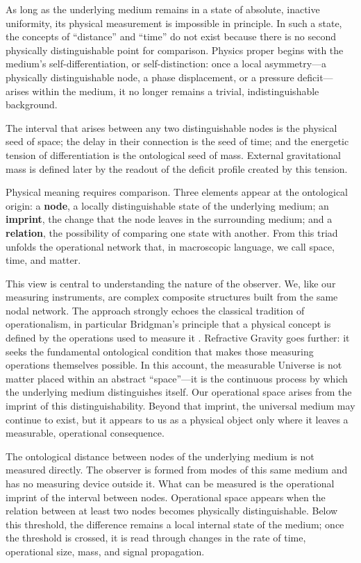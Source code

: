 \documentclass[11pt,a4paper]{article}
\begin{document}
As long as the underlying medium remains in a state of absolute, inactive uniformity, its physical measurement is impossible in principle. In such a state, the concepts of ``distance'' and ``time'' do not exist because there is no second physically distinguishable point for comparison. Physics proper begins with the medium's self-differentiation, or self-distinction: once a local asymmetry---a physically distinguishable node, a phase displacement, or a pressure deficit---arises within the medium, it no longer remains a trivial, indistinguishable background.

The interval that arises between any two distinguishable nodes is the physical seed of space; the delay in their connection is the seed of time; and the energetic tension of differentiation is the ontological seed of mass. External gravitational mass is defined later by the readout of the deficit profile created by this tension.

Physical meaning requires comparison. Three elements appear at the ontological origin: a \textbf{node}, a locally distinguishable state of the underlying medium; an \textbf{imprint}, the change that the node leaves in the surrounding medium; and a \textbf{relation}, the possibility of comparing one state with another. From this triad unfolds the operational network that, in macroscopic language, we call space, time, and matter.

This view is central to understanding the nature of the observer. We, like our measuring instruments, are complex composite structures built from the same nodal network. The approach strongly echoes the classical tradition of operationalism, in particular Bridgman's principle that a physical concept is defined by the operations used to measure it \citep{bridgman1927}. Refractive Gravity goes further: it seeks the fundamental ontological condition that makes those measuring operations themselves possible. In this account, the measurable Universe is not matter placed within an abstract ``space''---it is the continuous process by which the underlying medium distinguishes itself. Our operational space arises from the imprint of this distinguishability. Beyond that imprint, the universal medium may continue to exist, but it appears to us as a physical object only where it leaves a measurable, operational consequence.

The ontological distance between nodes of the underlying medium is not measured directly. The observer is formed from modes of this same medium and has no measuring device outside it. What can be measured is the operational imprint of the interval between nodes. Operational space appears when the relation between at least two nodes becomes physically distinguishable. Below this threshold, the difference remains a local internal state of the medium; once the threshold is crossed, it is read through changes in the rate of time, operational size, mass, and signal propagation.
\end{document}
